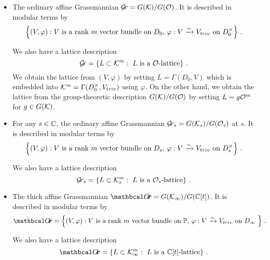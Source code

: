 \documentclass[draft]{article}
\begin{document}
\begin{itemize}
    \item The ordinary affine Grassmannian $\mathcal{G}\!r = G(\mathcal K)/G(\mathcal O)$. It is described in modular terms by %
    $$
    \left\{ (V, \varphi) : \text{$V$ is a rank $m$ vector bundle on $ D_0 $, $\varphi : V \xrightarrow{\sim} V_{triv} $ on $ D_0^\times $} \right\} \,. 
    $$
    
    We also have a lattice description 
    $$ 
    \mathcal{G}\!r = \left\{ L \subset \mathcal K^m : \text{ $L$ is a $\mathcal O$-lattice} \right\}\,.
    $$
    We obtain the lattice from $ (V,\varphi) $ by setting $ L = \Gamma(D_0, V)$ which is embedded into $ \mathcal K^m = \Gamma(D_0^\times, V_{triv})$ using $ \varphi$.  On the other hand, we obtain the lattice from the group-theoretic description $ G(\mathcal K) / G(\mathcal O) $ by setting $ L = g \mathcal O^m$ for $ g \in G(\mathcal K)$. 
    \item For any $ s \in \mathbb C $, 
    the ordinary affine Grassmannian $\mathcal{G}\!r_s = G(\mathcal K_s)/G(\mathcal O_s)$ at $ s $. It is described in modular terms by     $$
    \left\{ (V, \varphi) : \text{$V$ is a rank $m$ vector bundle on $ D_s $, $\varphi : V \xrightarrow{\sim} V_{triv} $ on $ D^\times_s $} \right\}\,.
    $$

    We also have a lattice description 
    $$ 
    \mathcal{G}\!r_s = \left\{ L \subset \mathcal K_s^m : \text{ $L$ is a $\mathcal O_s$-lattice} \right\} \,. 
    $$   
    \item The thick affine Grassmannian $\Grth = G(\Kinf)/G(\CC[t])$. %
    It is described in modular terms by
    $$
         \Grth = 
         \left\{ (V, \varphi) : \text{$V$ is a rank $m$ vector bundle on $ \PP $, $\varphi : V \xrightarrow{\sim} \Vtriv $ on $ D_\infty $ } \right\}\,. %
    $$
    
    We also have a lattice description 
    $$ 
    \Grth = \left\{ L \subset  \Kinf^m : \text{ $L$ is a $\CC[t]$-lattice} \right\}\,.
    $$ %
    


\end{itemize}
\end{document}

